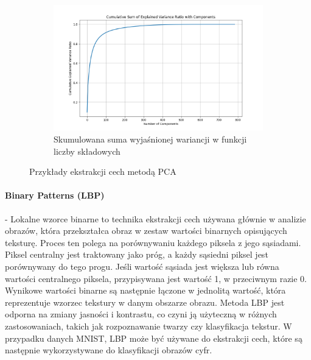 \documentclass[10pt]{article}
\begin{document}
\begin{figure}[H]
\begin{subfigure}{0.24\textwidth}
        \includegraphics[width=\linewidth]{img/PCA/PCA_cumulative_variance}
        \caption{Skumulowana suma wyjaśnionej wariancji w funkcji liczby składowych}\label{fig:pierwsza-strona}
    \end{subfigure}
    \caption{Przykłady ekstrakcji cech metodą PCA}
\end{figure}



\paragraph*{Binary Patterns (LBP)} - Lokalne wzorce binarne to technika ekstrakcji cech używana głównie w analizie obrazów, która przekształca obraz w zestaw wartości binarnych opisujących teksturę.
Proces ten polega na porównywaniu każdego piksela z jego sąsiadami.
Piksel centralny jest traktowany jako próg, a każdy sąsiedni piksel jest porównywany do tego progu.
Jeśli wartość sąsiada jest większa lub równa wartości centralnego piksela, przypisywana jest wartość 1, w przeciwnym razie 0. Wynikowe wartości binarne są następnie łączone w jednolitą wartość, która reprezentuje wzorzec tekstury w danym obszarze obrazu.
Metoda LBP jest odporna na zmiany jasności i kontrastu, co czyni ją użyteczną w różnych zastosowaniach, takich jak rozpoznawanie twarzy czy klasyfikacja tekstur. W przypadku danych MNIST, LBP może być używane do ekstrakcji cech, które są następnie wykorzystywane do klasyfikacji obrazów cyfr.
\end{document}
